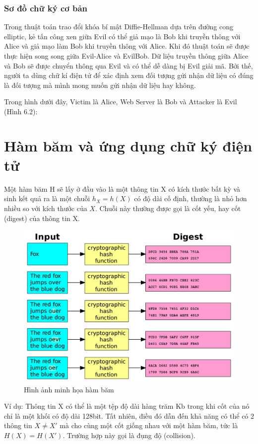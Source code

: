 \documentclass[a4paper,12pt]{report}
\begin{document}
\subsubsection{Sơ đồ chữ ký cơ bản}

Trong thuật toán trao đổi khóa bí mật Diffie-Hellman dựa trên đường cong elliptic, kẻ tấn công xen giữa Evil có thể giả mạo là Bob khi truyền thông với Alice và giả mạo làm Bob khi truyền thông với Alice. Khi đó thuật toán sẽ được thực hiện song song giữa Evil-Alice và EvilBob. Dữ liệu truyền thông giữa Alice và Bob sẽ được chuyển thông qua Evil và có thể dễ dàng bị Evil giải mã. Bởi thế, người ta dùng chữ kí điện tử để xác định xem đối tượng gửi nhận dữ liệu có đúng là đối tượng mà mình mong muốn gửi nhận dữ liệu hay không.

Trong hình dưới đây, Victim là Alice, Web Server là Bob và Attacker là Evil (Hình 6.2):
\section{Hàm băm và ứng dụng chữ ký điện tử}
Một hàm băm H sẽ lấy ở đầu vào là một thông tin X có kích thước bất kỳ và sinh kết quả ra là một chuỗi $h_X=h(X)$ có độ dài cố định, thường là nhỏ hơn nhiều so với kích thước của $X$. Chuỗi này thường được gọi là cốt yếu, hay cốt (digest) của thông tin X.
\begin{center}
\begin{figure}[H]
\includegraphics[width=0.8\linewidth]{../hash.png}
\caption{Hình ảnh minh họa hàm băm}
\end{figure}
\end{center}
Ví dụ: Thông tin X có thể là một tệp độ dài hàng trăm Kb trong khi cốt của nó chỉ là một khối có độ dài 128bit. Tất nhiên, điều đó dẫn đến khả năng có thể có 2 thông tin $X \neq X'$ mà cho cùng một cốt giống nhau với một hàm băm, tức là $H(X) = H(X')$. Trường hợp này gọi là đụng độ (collision).
\end{document}
